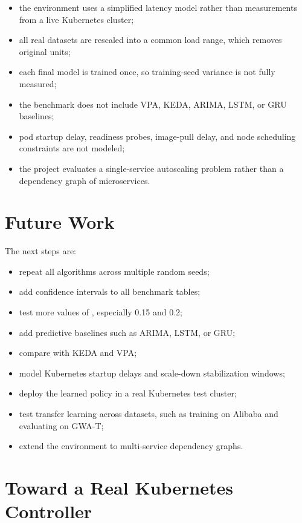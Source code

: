 \documentclass{rapportINPTCLOUD}
\newcommand{\pathcode}[1]{\texttt{\detokenize{#1}}}
\begin{document}
\begin{itemize}
  \item the environment uses a simplified latency model rather than measurements from a live Kubernetes cluster;
  \item all real datasets are rescaled into a common load range, which removes original units;
  \item each final model is trained once, so training-seed variance is not fully measured;
  \item the benchmark does not include VPA, KEDA, ARIMA, LSTM, or GRU baselines;
  \item pod startup delay, readiness probes, image-pull delay, and node scheduling constraints are not modeled;
  \item the project evaluates a single-service autoscaling problem rather than a dependency graph of microservices.
\end{itemize}

\section{Future Work}

The next steps are:

\begin{itemize}
  \item repeat all algorithms across multiple random seeds;
  \item add confidence intervals to all benchmark tables;
  \item test more values of \pathcode{gamma_stab}, especially 0.15 and 0.2;
  \item add predictive baselines such as ARIMA, LSTM, or GRU;
  \item compare with KEDA and VPA;
  \item model Kubernetes startup delays and scale-down stabilization windows;
  \item deploy the learned policy in a real Kubernetes test cluster;
  \item test transfer learning across datasets, such as training on Alibaba and evaluating on GWA-T;
  \item extend the environment to multi-service dependency graphs.
\end{itemize}

\section{Toward a Real Kubernetes Controller}
\end{document}
